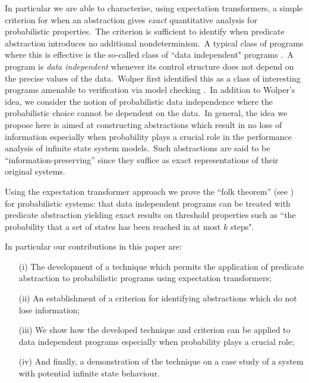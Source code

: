 \documentclass[numbers,copyright,creativecommons]{eptcs}
\begin{document}
In particular we are able to characterise, using expectation transformers, a simple criterion for when an abstraction gives \emph{exact} quantitative analysis for probabilistic properties.\ The criterion is sufficient to identify when predicate abstraction introduces no additional nondeterminism.\ A typical class of programs where this is effective is the so-called class of ``data independent" programs \cite{Wolper86}.\ A program is \emph{data independent} whenever its control structure does not depend on the precise values of the data.\ Wolper \cite{Wolper86} first identified this as a class of interesting programs amenable to verification via model checking \cite{CGP99}.\ In addition to Wolper's idea, we consider the notion of probabilistic data independence where the probabilistic choice cannot be dependent on the data.\ In general, the idea we propose here is aimed at constructing abstractions which result in no loss of information especially when probability plays a crucial role in the performance analysis of infinite state system models.\ Such abstractions are said to be ``information-preserving'' since they suffice as exact representations of their original systems.

Using the expectation transformer approach we prove the ``folk theorem'' (see \cite{FM86}) for probabilistic systems: that data independent programs can be treated with predicate abstraction yielding exact results on threshold properties such as ``the probability that a set of states has been reached in at most $k$ steps".

In particular our contributions in this paper are:
\begin{enumerate}
\item [(i)] The development of a technique which permits the application of predicate abstraction to probabilistic programs using expectation transformers;

\item [(ii)] An establishment of a criterion for identifying abstractions which do not lose information;

\item [(iii)] We show how the developed technique and criterion can be applied to data independent programs
    especially when probability plays a crucial role;

\item [(iv)] And finally, a demonstration of the technique on a case study of a system with potential infinite state behaviour.
\end{enumerate}
\end{document}
